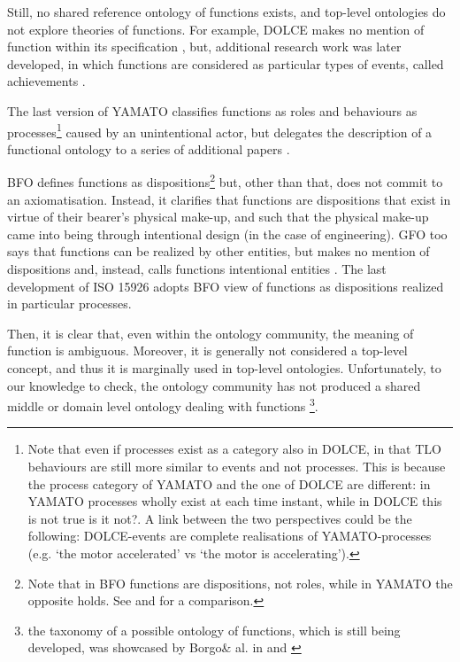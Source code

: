 \documentclass[sw]{iosart2x}
\newcommand{\DOLCE}{\textsc{DOLCE}\xspace} %
\newcommand{\YAMATO}{\textsc{YAMATO}\xspace}
\newcommand{\BFO}{\textsc{BFO}\xspace}
\newcommand{\GFO}{\textsc{GFO}\xspace}
\newcommand{\TLO}{\textnormal{TLO}\xspace}
\newcommand{\quotes}[1]{`#1'}
\newcommand{\TODO}[1]{{\color{red} #1}}
\begin{document}
Still, no shared reference ontology of functions exists, and top-level ontologies do not explore theories of functions. 
For example, \DOLCE makes no mention of function within its specification \cite{masoloWonderWebDeliverableD182003}, but, additional research work was later developed, in which 
functions are considered as particular types of events, called achievements \cite{borgoCapabilitiesCapacitiesFunctionalities2021}. 

The last version of \YAMATO classifies functions as roles and behaviours as processes\footnote{Note that even if processes exist as a category also in \DOLCE, in that \TLO behaviours are still more similar to events and not processes. This is because the process category of \YAMATO and the one of \DOLCE are different: in \YAMATO processes wholly exist at each time instant, while in \DOLCE this is not true\TODO{ is it not?}. A link between the two perspectives could be the following: \DOLCE-events are complete realisations of \YAMATO-processes (e.g. \quotes{the motor accelerated} vs \quotes{the motor is accelerating}).} caused by an unintentional actor, but delegates the description of a functional ontology to a series of additional papers \cite{kitamuraOntologicalModelDevice2006, kitamuraCharacterizingFunctionsBased2013, mizoguchiFunctionalOntologyArtifacts2009}. 

\BFO defines functions as dispositions\footnote{Note that in \BFO functions are dispositions, not roles, while in \YAMATO the opposite holds. See \cite{mizoguchiFunctionalOntologyArtifacts2009} and \cite{spearFunctionsBasicFormal2016} for a comparison.} 
but, other than that, does not commit to an axiomatisation. 
Instead, it clarifies that functions are dispositions that exist in virtue of their bearer's physical make-up, and such that the physical make-up came into being through intentional design (in the case of engineering). 
\GFO too says that functions can be realized by other entities, but makes no mention of dispositions and, instead, calls functions intentional entities \cite{herreGeneralFormalOntology2006}.
The last development of ISO 15926 \cite{kluwerISO159261420202020} adopts \BFO view of functions as dispositions realized in particular processes.

Then, it is clear that, even within the ontology community, the meaning of function is ambiguous. 
Moreover, it is generally not considered a top-level concept, and thus it is marginally used in top-level ontologies. 
Unfortunately, to our knowledge \TODO{to check}, the ontology community has not produced a shared middle or domain level ontology dealing with functions \footnote{the taxonomy of a possible ontology of functions, which is still being developed, was showcased by Borgo\& al. in \cite{borgoCapabilitiesCapacitiesFunctionalities2021} and \cite{borgoKnowledgebasedAdaptiveAgents2019}}. 
\end{document}
